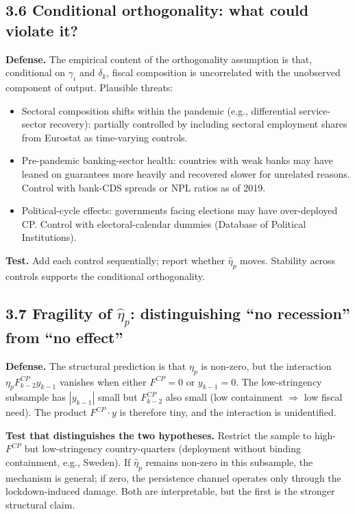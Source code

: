 \documentclass[11pt,a4paper]{article}
\begin{document}
\subsection*{3.6 Conditional orthogonality: what could violate it?}

\textbf{Defense.} The empirical content of the orthogonality assumption is that, conditional on $\gamma_i$ and $\delta_k$, fiscal composition is uncorrelated with the unobserved component of output. Plausible threats:
\begin{itemize}
\item Sectoral composition shifts within the pandemic (e.g., differential service-sector recovery): partially controlled by including sectoral employment shares from Eurostat as time-varying controls.
\item Pre-pandemic banking-sector health: countries with weak banks may have leaned on guarantees more heavily and recovered slower for unrelated reasons. Control with bank-CDS spreads or NPL ratios as of 2019.
\item Political-cycle effects: governments facing elections may have over-deployed CP. Control with electoral-calendar dummies (Database of Political Institutions).
\end{itemize}

\textbf{Test.} Add each control sequentially; report whether $\hat\eta_p$ moves. Stability across controls supports the conditional orthogonality.

\subsection*{3.7 Fragility of $\hat\eta_p$: distinguishing ``no recession'' from ``no effect''}

\textbf{Defense.} The structural prediction is that $\eta_p$ is non-zero, but the interaction $\eta_p F^{CP}_{k-2} y_{k-1}$ vanishes when either $F^{CP} = 0$ or $y_{k-1} = 0$. The low-stringency subsample has $|y_{k-1}|$ small but $F^{CP}_{k-2}$ also small (low containment $\Rightarrow$ low fiscal need). The product $F^{CP} \cdot y$ is therefore tiny, and the interaction is unidentified.

\textbf{Test that distinguishes the two hypotheses.} Restrict the sample to high-$F^{CP}$ but low-stringency country-quarters (deployment without binding containment, e.g., Sweden). If $\hat\eta_p$ remains non-zero in this subsample, the mechanism is general; if zero, the persistence channel operates only through the lockdown-induced damage. Both are interpretable, but the first is the stronger structural claim.
\end{document}
